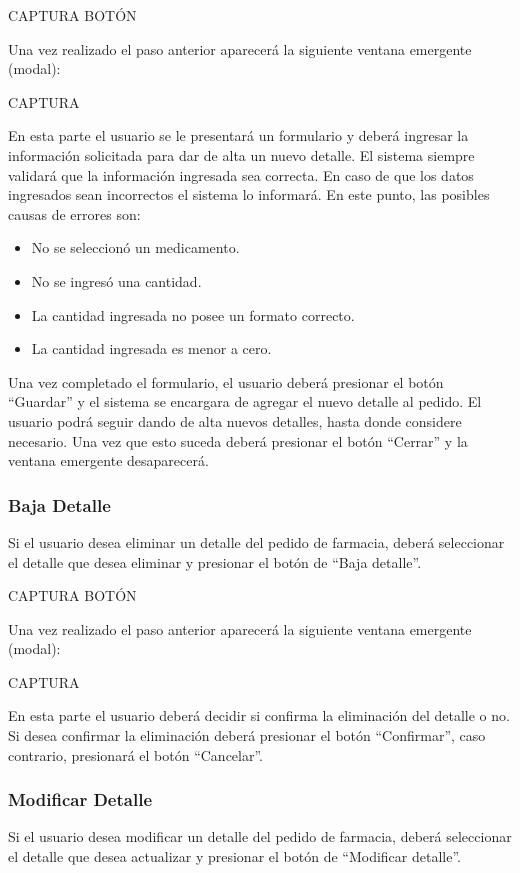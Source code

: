 \documentclass[letterpaper,10pt,spanish]{sphinxmanual}
\begin{document}
CAPTURA BOTÓN

Una vez realizado el paso anterior aparecerá la siguiente ventana emergente (modal):

CAPTURA

En esta parte el usuario se le presentará un formulario y deberá ingresar la información solicitada para dar de alta un nuevo detalle.
El sistema siempre validará que la información ingresada sea correcta. En caso de que los datos ingresados sean incorrectos el sistema lo informará.
En este punto, las posibles causas de errores son:
\begin{itemize}
\item {} 
No se seleccionó un medicamento.

\item {} 
No se ingresó una cantidad.

\item {} 
La cantidad ingresada no posee un formato correcto.

\item {} 
La cantidad ingresada es menor a cero.

\end{itemize}

Una vez completado el formulario, el usuario deberá presionar el botón “Guardar” y el sistema se encargara de agregar el nuevo detalle al pedido.
El usuario podrá seguir dando de alta nuevos detalles, hasta donde considere necesario. Una vez que esto suceda deberá presionar el botón “Cerrar” y la ventana emergente desaparecerá.


\subsubsection{Baja Detalle}
\label{pedidosfarmacia:baja-detalle}
Si el usuario desea eliminar un detalle del pedido de farmacia, deberá seleccionar el detalle que desea eliminar y presionar el botón de “Baja detalle”.

CAPTURA BOTÓN

Una vez realizado el paso anterior aparecerá la siguiente ventana emergente (modal):

CAPTURA

En esta parte el usuario deberá decidir si confirma la eliminación del detalle o no. Si desea confirmar la eliminación deberá presionar el botón “Confirmar”, caso contrario, presionará el botón “Cancelar”.


\subsubsection{Modificar Detalle}
\label{pedidosfarmacia:modificar-detalle}
Si el usuario desea modificar un detalle del pedido de farmacia, deberá seleccionar el detalle que desea actualizar y presionar el botón de “Modificar detalle”.
\end{document}
